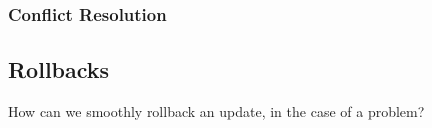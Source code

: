 \subsubsection{Conflict Resolution}



\subsection{Rollbacks}
How can we smoothly rollback an update, in the case of a problem?


%
%
%

